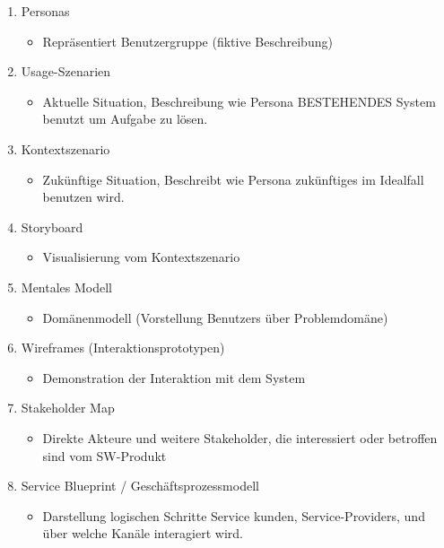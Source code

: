 \documentclass{article}
\begin{document}
\begin{enumerate}
	\item Personas
	\begin{itemize}
		\item Repräsentiert Benutzergruppe (fiktive Beschreibung)
	\end{itemize}
	
	\item Usage-Szenarien
	\begin{itemize}
		\item Aktuelle Situation, Beschreibung wie Persona BESTEHENDES System benutzt um Aufgabe zu lösen.
	\end{itemize}
	
	\item Kontextszenario
	\begin{itemize}
		\item Zukünftige Situation, Beschreibt wie Persona zukünftiges im Idealfall benutzen wird.
	\end{itemize}
	
	\item Storyboard
	\begin{itemize}
		\item Visualisierung vom Kontextszenario
	\end{itemize}
	
	\item Mentales Modell
	\begin{itemize}
		\item Domänenmodell (Vorstellung Benutzers über Problemdomäne)
	\end{itemize}
	
	\item Wireframes (Interaktionsprototypen)
	\begin{itemize}
		\item Demonstration der Interaktion mit dem System
	\end{itemize}
	
	\item Stakeholder Map
	\begin{itemize}
		\item Direkte Akteure und weitere Stakeholder, die interessiert oder betroffen sind vom SW-Produkt
	\end{itemize}
	
	\item Service Blueprint / Geschäftsprozessmodell
	\begin{itemize}
		\item Darstellung logischen Schritte Service kunden, Service-Providers, und über welche Kanäle interagiert wird.
	\end{itemize}
\end{enumerate}
\end{document}
